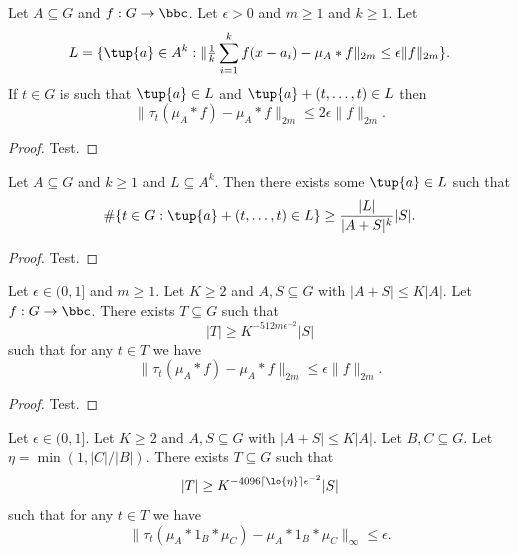 \begin{lemma}
  \label{aps_in_translates}
  \leanok

  Let $A\subseteq G$ and $f:G\to \bbc$. Let $\epsilon>0$ and $m\geq 1$ and $k\geq 1$. Let
  \[
    L = \{\tup{a}\in A^k : \|\tfrac{1}{k}\sum_{i=1}^k f(x-a_i) - \mu_A\ast f\|_{2m}
      \leq \epsilon \| f\|_{2m}\}.
  \]
  If $t\in G$ is such that $\tup{a}\in L$ and $\tup{a}+(t,\ldots,t)\in L$ then
  \[\| \tau_t(\mu_A\ast f)-\mu_A\ast f\|_{2m}\leq 2\epsilon \|f\|_{2m}.\]
\end{lemma}

\begin{proof}
\leanok
Test.
\end{proof}


\begin{lemma}
\label{lots_of_diagonals}
\leanok
Let $A\subseteq G$ and $k\geq 1$ and $L\subseteq A^k$. Then there exists some $\tup{a}\in L$ such that
\[\#\{ t\in G : \tup{a}+(t,\ldots,t)\in L\}\geq \frac{\lvert L\rvert}{\lvert A+S\rvert^k}\lvert S\rvert.\]
\end{lemma}

\begin{proof}
\leanok
Test.
\end{proof}


\begin{theorem}
\label{lp_ap}
\leanok
Let $\epsilon\in (0,1]$ and $m\geq 1$. Let $K\geq 2$ and $A,S\subseteq G$ with $\lvert A+S\rvert\leq K\lvert A\rvert$.
Let $f:G\to \bbc$. There exists $T\subseteq G$ such that
\[\lvert T\rvert \geq K^{-512m\epsilon^{-2}}\lvert S\rvert\]
such that for any $t\in T$ we have
\[\| \tau_t(\mu_A\ast f)-\mu_A\ast f\|_{2m}\leq \epsilon \| f\|_{2m}.\]
\end{theorem}

\begin{proof}
\leanok
Test.
\end{proof}


\begin{theorem}
\label{linfty_ap}
\leanok
Let $\epsilon\in (0,1]$. Let $K\geq 2$ and $A,S\subseteq G$ with $\lvert A+S\rvert\leq K\lvert A\rvert$.
Let $B,C\subseteq G$. Let $\eta=\min(1,\lvert C\rvert/\lvert B\rvert)$. There exists $T\subseteq G$ such that
\[\lvert T\rvert \geq K^{-4096\lceil \lo{\eta}\rceil\epsilon^{-2}}\lvert S\rvert\]
such that for any $t\in T$ we have
\[\| \tau_t(\mu_A\ast 1_B\ast \mu_C)-\mu_A\ast 1_B\ast \mu_C\|_{\infty}\leq \epsilon.\]
\end{theorem}

